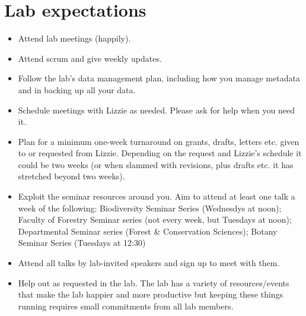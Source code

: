 \documentclass[11pt,a4paper,oneside]{article}
\begin{document}
\section{Lab expectations}
\begin{itemize}
\item Attend lab meetings (happily). %
\item Attend scrum and give weekly updates. 
\item Follow the lab's data management plan, including how you manage metadata and in backing up all your data.
\item Schedule meetings with Lizzie as needed. Please ask for help when you need it.
\item Plan for a minimum one-week turnaround on grants, drafts, letters etc. given to or requested from Lizzie. Depending on the request and Lizzie's schedule it could be two weeks (or when slammed with revisions, plus drafts etc. it has stretched beyond two weeks). 
\item Exploit the seminar resources around you. Aim to attend at least one talk a week of the following: Biodiversity Seminar Series (Wednesdys at noon); Faculty of Forestry Seminar series (not every week, but Tuesdays at noon); Departmental Seminar series (Forest \& Conservation Sciences); Botany Seminar Series (Tuesdays at 12:30)  %
\item Attend all talks by lab-invited speakers and sign up to meet with them. 
\item Help out as requested in the lab. The lab has a variety of resources/events that make the lab happier and more productive but keeping these things running requires small commitments from all lab members. 


\end{itemize}
\end{document}
